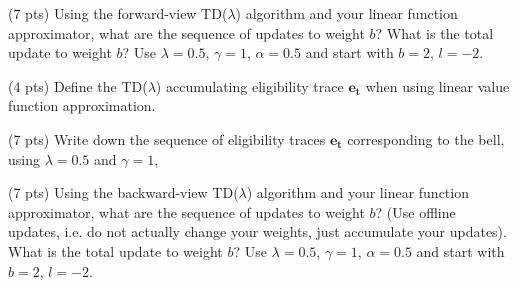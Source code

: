\documentclass[12pt]{exam}
\newif\ifanswers
\begin{document}
\begin{continuequestion}
\begin{subquestion} (7 pts)
Using the forward-view TD($\lambda$) algorithm and your linear
function approximator, what are the sequence of updates to weight $b$?
What is the total update to weight $b$?  Use $\lambda = 0.5$, $\gamma = 1$, $\alpha = 0.5$ and start with $b = 2$, $l = -2$.
  \begin{minipage}[t][1.5in]{\linewidth}
    \ifanswers
    Put answer here
    \fi
  \end{minipage}
\end{subquestion}
\begin{subquestion} (4 pts)
Define the TD($\lambda$) accumulating eligibility trace $\mathbf{e_t}$
when using linear value function approximation.
  \begin{minipage}[t][1.5in]{\linewidth}
    \ifanswers
    Put answer here
    \fi
  \end{minipage}
\end{subquestion}
\begin{subquestion} (7 pts)
Write down the sequence of eligibility traces $\mathbf{e_t}$
corresponding to the bell, using $\lambda = 0.5$ and $\gamma = 1$,
  \begin{minipage}[t][1.5in]{\linewidth}
    \ifanswers
    Put answer here
    \fi
  \end{minipage}
\end{subquestion}
\begin{subquestion} (7 pts)
Using the backward-view TD($\lambda$) algorithm and your linear
function approximator, what are the sequence of updates to weight $b$?
(Use offline updates, i.e. do not actually change your weights, just
accumulate your updates). What is the total update to weight $b$? Use
$\lambda = 0.5$, $\gamma = 1$, $\alpha = 0.5$ and start with $b = 2$,
$l = -2$.
  \begin{minipage}[t][1.5in]{\linewidth}
    \ifanswers
    Put answer here
    \fi
  \end{minipage}
\end{subquestion}
\end{continuequestion}





\end{document}
